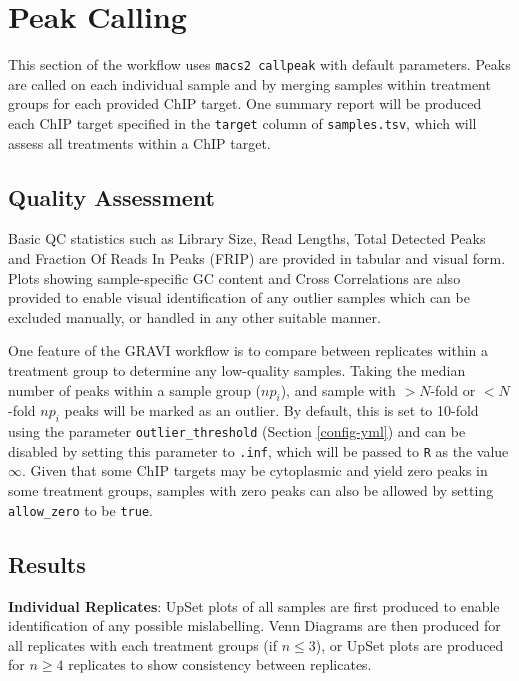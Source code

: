 \documentclass[
]{book}
\begin{document}
\hypertarget{peak-calling}{%
\section{Peak Calling}\label{peak-calling}}

This section of the workflow uses \texttt{macs2\ callpeak}\citep{macs2} with default parameters.
Peaks are called on each individual sample and by merging samples within treatment groups for each provided ChIP target.
One summary report will be produced each ChIP target specified in the \texttt{target} column of \texttt{samples.tsv}, which will assess all treatments within a ChIP target.

\hypertarget{quality-assessment}{%
\subsection*{Quality Assessment}\label{quality-assessment}}

Basic QC statistics such as Library Size, Read Lengths, Total Detected Peaks and Fraction Of Reads In Peaks (FRIP) are provided in tabular and visual form.
Plots showing sample-specific GC content and Cross Correlations are also provided to enable visual identification of any outlier samples which can be excluded manually, or handled in any other suitable manner.

One feature of the GRAVI workflow is to compare between replicates within a treatment group to determine any low-quality samples.
Taking the median number of peaks within a sample group (\(np_i\)), and sample with \(>N\)-fold or \(<N\)-fold \(np_i\) peaks will be marked as an outlier.
By default, this is set to 10-fold using the parameter \texttt{outlier\_threshold} (Section \ref{config-yml}) and can be disabled by setting this parameter to \texttt{.inf}, which will be passed to \texttt{R} as the value \(\infty\).
Given that some ChIP targets may be cytoplasmic and yield zero peaks in some treatment groups, samples with zero peaks can also be allowed by setting \texttt{allow\_zero} to be \texttt{true}.

\hypertarget{results}{%
\subsection*{Results}\label{results}}

\textbf{Individual Replicates}: UpSet plots\citep{upsetr} of all samples are first produced to enable identification of any possible mislabelling.
Venn Diagrams are then produced for all replicates with each treatment groups (if \(n \leq3\)), or UpSet plots are produced for \(n \geq4\) replicates to show consistency between replicates.
\end{document}
